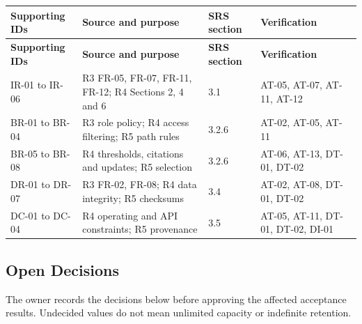 \documentclass[11pt,letterpaper]{article}
\begin{document}
\begin{longtable}{|P{\arrayrulewidth\relax}|P{\arrayrulewidth\relax}|P{\arrayrulewidth\relax}|P{\arrayrulewidth\relax}|}

\hline{}

\textbf{Supporting IDs} & \textbf{Source and purpose} & \textbf{SRS section} & \textbf{Verification} \\ \hline

\endfirsthead

\hline{}

\textbf{Supporting IDs} & \textbf{Source and purpose} & \textbf{SRS section} & \textbf{Verification} \\ \hline

\endhead

\hline\endfoot

\hline\endlastfoot

IR-01 to IR-06 & R3 FR-05, FR-07, FR-11, FR-12; R4 Sections 2, 4 and 6 & 3.1 & AT-05, AT-07, AT-11, AT-12 \\ \hline

BR-01 to BR-04 & R3 role policy; R4 access filtering; R5 path rules & 3.2.6 & AT-02, AT-05, AT-11 \\ \hline

BR-05 to BR-08 & R4 thresholds, citations and updates; R5 selection & 3.2.6 & AT-06, AT-13, DT-01, DT-02 \\ \hline

DR-01 to DR-07 & R3 FR-02, FR-08; R4 data integrity; R5 checksums & 3.4 & AT-02, AT-08, DT-01, DT-02 \\ \hline

DC-01 to DC-04 & R4 operating and API constraints; R5 provenance & 3.5 & AT-05, AT-11, DT-01, DT-02, DI-01 \\ \hline

\end{longtable}

\endgroup

\subsection{Open Decisions}

The owner records the decisions below before approving the affected acceptance results. Undecided values do not mean unlimited capacity or indefinite retention.\par
\end{document}
